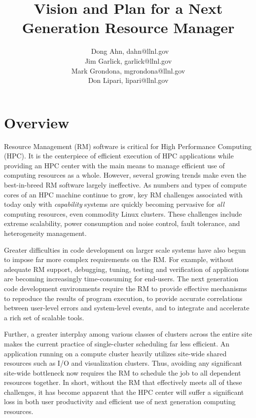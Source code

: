 \documentclass{article}
\newcommand{\ngrmfull}{Next Generation Resource Manager}
\begin{document}
\title{Vision and Plan for a \ngrmfull}
\author{\
Dong Ahn, dahn@llnl.gov\\
Jim Garlick, garlick@llnl.gov\\
Mark Grondona, mgrondona@llnl.gov\\
Don Lipari, lipari@llnl.gov}


\maketitle

\section{Overview}

Resource Management (RM) software is critical for High Performance Computing
(HPC). It is the centerpiece of efficient execution of HPC applications
while providing an HPC center with the main means to manage efficient use
of computing resources as a whole.  However, several growing trends make
even the best-in-breed RM software largely ineffective.  As numbers and
types of compute cores of an HPC machine continue to grow, key RM challenges
associated with today only with {\em capability} systems are quickly
becoming pervasive for {\em all} computing resources, even commodity
Linux clusters.  These challenges include extreme scalability, power
consumption and noise control, fault tolerance, and heterogeneity management.

Greater difficulties in code development on larger scale systems have
also begun to impose far more complex requirements on the RM.  For example,
without adequate RM support, debugging, tuning, testing and verification
of applications are becoming increasingly time-consuming for end-users.
The next generation code development environments require the RM to provide
effective mechanisms to reproduce the results of program execution, to
provide accurate correlations between user-level errors and system-level
events, and to integrate and accelerate a rich set of scalable tools.

Further, a greater interplay among various classes of clusters across
the entire site makes the current practice of single-cluster scheduling
far less efficient.  An application running on a compute cluster heavily
utilizes site-wide shared resources such as I/O and visualization clusters.
Thus, avoiding any significant site-wide bottleneck now requires the RM
to schedule the job to all dependent resources together. In short, without
the RM that effectively meets all of these challenges, it has become apparent
that the HPC center will suffer a significant loss in both user productivity
and efficient use of next generation computing resources.
\end{document}
